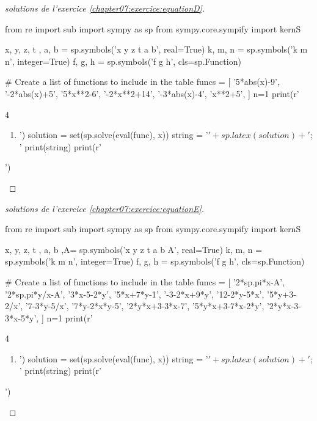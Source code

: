 \begin{proof}[solutions de l'exercice \ref{chapter07:exercice:equationD}]\hfill  
\begin{pycode}
from re import sub
import sympy as sp
from sympy.core.sympify import kernS

x, y, z, t , a, b = sp.symbols('x y z t a b', real=True)
k, m, n = sp.symbols('k m n', integer=True)
f, g, h = sp.symbols('f g h', cls=sp.Function)

# Create a list of functions to include in the table
funcs = [
'5*abs(x)-9', 
'-2*abs(x)+5',
'5*x**2-6',
'-2*x**2+14',
'-3*abs(x)-4',
'x**2+5', 
]
n=1
print(r'\begin{multicols}{4} \begin{enumerate}[label={$S_{\arabic*}=$}] ')
for func in funcs:
	print('\item ')
	solution = set(sp.solve(eval(func), x))
	string =  '$'+   sp.latex(solution ) + '$; '
	print(string)
print(r'\end{enumerate} \end{multicols} ')
\end{pycode}
\end{proof}
\begin{proof}[solutions de l'exercice \ref{chapter07:exercice:equationE}]\hfill  
\begin{pycode}
from re import sub
import sympy as sp
from sympy.core.sympify import kernS

x, y, z, t , a, b ,A= sp.symbols('x y z t a b A', real=True)
k, m, n = sp.symbols('k m n', integer=True)
f, g, h = sp.symbols('f g h', cls=sp.Function)

# Create a list of functions to include in the table
funcs = [
'2*sp.pi*x-A',
'2*sp.pi*y/x-A',
'3*x-5-2*y',
'5*x+7*y-1',
'-3-2*x+9*y',
'12-2*y-5*x',
'5*y+3-2/x',
'7-3*y-5/x',
'7*y-2*x*y-5',
'2*y*x+3-3*x-7',
'5*y*x+3-7*x-2*y',
'2*y*x-3-3*x-5*y',
]
n=1
print(r'\begin{multicols}{4} \begin{enumerate}[label={\alph*)}] ')
for func in funcs:
	print('\item ')
	solution = set(sp.solve(eval(func), x))
	string =  '$'+   sp.latex(solution ) + '$; '
	print(string)
print(r'\end{enumerate} \end{multicols} ')
\end{pycode}
\end{proof}